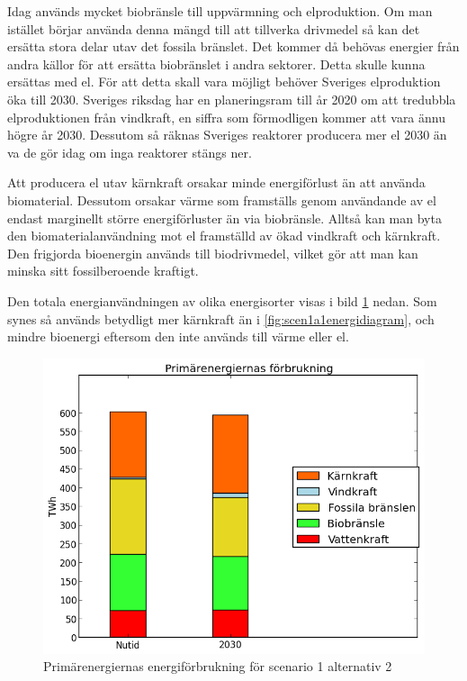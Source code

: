 \documentclass[a4paper,11pt,fleqn, titlepage]{article}
\begin{document}
Idag används mycket biobränsle till uppvärmning och elproduktion. Om man istället börjar använda denna mängd till att tillverka drivmedel så kan det ersätta stora delar utav det fossila bränslet. Det kommer då behövas energier från andra källor för att ersätta biobränslet i andra sektorer. Detta skulle kunna ersättas med el. För att detta skall vara möjligt behöver Sveriges elproduktion öka till 2030. Sveriges riksdag har en planeringsram till år 2020 om att tredubbla elproduktionen från vindkraft, en siffra som förmodligen kommer att vara ännu högre år 2030. Dessutom så räknas Sveriges reaktorer producera mer el 2030 än va de gör idag om inga reaktorer stängs ner\cite{energimyndigheten}.

Att producera el utav kärnkraft orsakar minde energiförlust än att använda biomaterial. Dessutom orsakar värme som framställs genom användande av el endast marginellt större energiförluster än via biobränsle. Alltså kan man byta den biomaterialanvändning mot el framställd av ökad vindkraft och kärnkraft. Den frigjorda bioenergin används till biodrivmedel, vilket gör att man kan minska sitt fossilberoende kraftigt.

Den totala energianvändningen av olika energisorter visas i bild \ref{fig:scen1a2energidiagram} nedan. Som synes så används betydligt mer kärnkraft än i \ref{fig:scen1a1energidiagram}, och mindre bioenergi eftersom den inte används till värme eller el.

\begin{figure}[h!]
       \centering
       \includegraphics[scale=0.7]{scen1a2energidiagram.png}
       \caption{Primärenergiernas energiförbrukning för scenario 1 alternativ 2}
       \label{fig:scen1a2energidiagram}
\end{figure}
\end{document}
